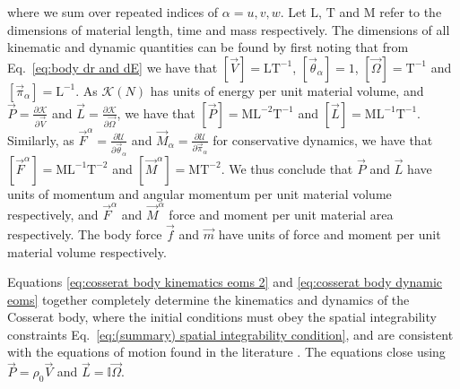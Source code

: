 where we sum over repeated indices of $\alpha = u, v, w$. Let $\mathrm{L}$, $\mathrm{T}$ and $\mathrm{M}$ refer to the dimensions of material length, time and mass respectively. The dimensions of all kinematic and dynamic quantities can be found by first noting that from Eq.~\ref{eq:body dr and dE} we have that $[\vec{V}] = \mathrm{L} \mathrm{T}^{-1}$, $[\vec{\theta}_\alpha] = 1$, $[\vec{\Omega}] = \mathrm{T}^{-1}$ and $[\vec{\pi}_\alpha] = \mathrm{L}^{-1}$. As $\mathcal{K}(N)$ has units of energy per unit material volume, and $\vec{P} = \frac{\partial \mathcal{K}}{\partial \vec{V}}$ and $\vec{L} = \frac{\partial \mathcal{K}}{\partial \vec{\Omega}}$, we have that $[\vec{P}] = \mathrm{M} \mathrm{L}^{-2} \mathrm{T}^{-1}$ and $[\vec{L}] = \mathrm{M} \mathrm{L}^{-1} \mathrm{T}^{-1}$. Similarly, as $\vec{F}^\alpha = \frac{\partial \mathcal{U}}{\partial \vec{\theta}_\alpha}$ and $\vec{M}_\alpha = \frac{\partial \mathcal{U}}{\partial \vec{\pi}_\alpha}$ for conservative dynamics, we have that $[\vec{F}^\alpha] = \mathrm{M} \mathrm{L}^{-1} \mathrm{T}^{-2}$ and $[\vec{M}^\alpha] = \mathrm{M} \mathrm{T}^{-2}$. We thus conclude that $\vec{P}$ and $\vec{L}$ have units of momentum and angular momentum per unit material volume respectively, and $\vec{F}^\alpha$ and $\vec{M}^\alpha$ force and moment per unit material area respectively. The body force $\vec{f}$ and $\vec{m}$ have units of force and moment per unit material volume respectively. 

Equations \ref{eq:cosserat body kinematics eoms 2} and \ref{eq:cosserat body dynamic eoms} together completely determine the kinematics and dynamics of the Cosserat body,  where the initial conditions must obey the spatial integrability constraints Eq.~\ref{eq:(summary) spatial integrability condition}, and are consistent with the equations of motion found in the literature \citep{rubinCosseratRods2000}. The equations close using $\vec{P} = \rho_0 \vec{V}$ and $\vec{L} = \mathbb{I} \vec{\Omega}$.

